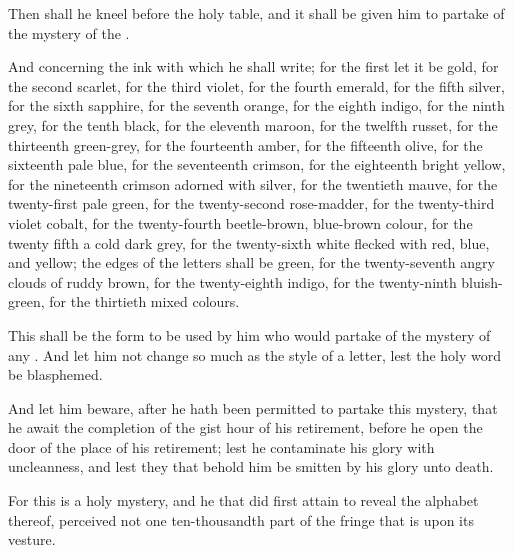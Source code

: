 Then shall he kneel before the holy table, and it shall be given him to partake of the mystery of the \AEthyr{}.

And concerning the ink with which he shall write; for the first \AEthyr{} let it be gold, for the second scarlet, for the third violet, for the fourth emerald, for the fifth silver, for the sixth sapphire, for the seventh orange, for the eighth indigo, for the ninth grey, for the tenth black, for the eleventh maroon, for the twelfth russet, for the thirteenth green-grey, for the fourteenth amber, for the fifteenth olive, for the sixteenth pale blue, for the seventeenth crimson, for the eighteenth bright yellow, for the nineteenth crimson adorned with silver, for the twentieth mauve, for the twenty-first pale green, for the twenty-second rose-madder, for the twenty-third violet cobalt, for the twenty-fourth beetle-brown, blue-brown colour, for the twenty fifth a cold dark grey, for the twenty-sixth white ﬂecked with red, blue, and yellow; the edges of the letters shall be green, for the twenty-seventh angry clouds of ruddy brown, for the twenty-eighth indigo, for the twenty-ninth bluish-green, for the thirtieth mixed colours.

This shall be the form to be used by him who would partake of the mystery of any \AEthyr{}. And let him not change so much as the style of a letter, lest the holy word be blasphemed.

And let him beware, after he hath been permitted to partake this mystery, that he await the completion of the gist hour of his retirement, before he open the door of the place of his retirement; lest he contaminate his glory with uncleanness, and lest they that behold him be smitten by his glory unto death.

For this is a holy mystery, and he that did first attain to reveal the alphabet thereof, perceived not one ten-thousandth part of the fringe that is upon its vesture.
